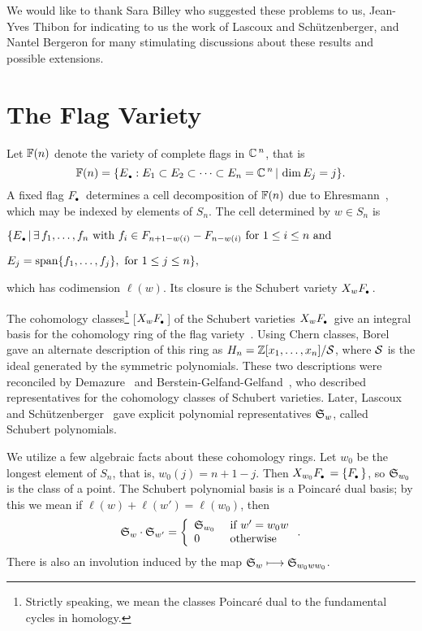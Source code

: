 We would like to thank Sara Billey who suggested these problems to us,
Jean-Yves Thibon for indicating to us the work of Lascoux and 
Sch\"utzenberger, and Nantel Bergeron for many stimulating discussions 
about these results and possible extensions.

\section{The Flag Variety}

Let ${\Bbb F}(n)$ denote the variety of complete flags in ${\Bbb C}\,^n$, 
that is
$$
{\Bbb F}(n) = 
\{ \Edot : E_1\subset E_2\subset \cdots\subset E_n = {\Bbb C}\,^n \,|\,
\dim{E_j} = j\}.
$$
A fixed flag $\Fdot$ determines a cell decomposition of ${\Bbb F}(n)$
due to Ehresmann~\cite{Ehresmann}, which may be
indexed by elements of $S_n$.
The cell determined by $w \in S_n$ is 
\medskip

\noindent $\{ \Edot \,|\, \exists\, f_1,\ldots,f_n \mbox{ with }
f_i \in F_{n+1-w(i)}-
F_{n-w(i)} \mbox{ for }  1\leq i\leq n \mbox{ and }$

\hfill
$E_j = \mbox{span}\{f_1,\ldots,f_j\},\mbox{ for }  1\leq j\leq n\},$\medskip

\noindent
which has codimension $\ell(w)$.
Its closure is the Schubert variety   $X_{w}\Fdot$.


The cohomology classes\footnote{Strictly speaking, we mean the 
classes Poincar\'e dual to the fundamental cycles in homology.}
[$X_w\Fdot$] of the Schubert varieties $X_w\Fdot$ give 
an integral basis for the cohomology ring of the flag 
variety~\cite{Ehresmann}.
Using Chern classes, Borel~\cite{Borel} gave an alternate description 
of this ring as $H_n = {\Bbb Z}[x_1,\ldots,x_n]/{\cal S}$, 
where ${\cal S}$ is the ideal generated by the symmetric polynomials.
These two descriptions were reconciled by Demazure~\cite{Demazure}
and Berstein-Gelfand-Gelfand~\cite{BGG}, who described 
representatives for the cohomology classes of Schubert varieties.
Later, Lascoux and 
Sch\"utzenberger~\cite{Lascoux_Schutzenberger_polynomes_schubert}
gave explicit polynomial representatives ${\frak S}_{w}$, called 
Schubert polynomials.

We utilize a few algebraic facts about these cohomology rings.
Let $w_0$ be the longest element of $S_n$, that is,
$w_0(j) = n{+}1{-}j$.
Then 
$X_{w_0}\Fdot = \{\Fdot\}$, so ${\frak S}_{w_0}$
is the class of a point.
The Schubert polynomial basis is a Poincar\'e dual basis;
by this we mean  if 
$\ell(w) + \ell(w') = \ell(w_0)$, then 
$$
{\frak S}_{w} \cdot {\frak S}_{w'}
= \left\{\begin{array}{ll} {\frak S}_{w_0}&\mbox{ if }
w' = w_0 w\\
0 & \mbox{ otherwise} \end{array}\right.. %
$$
There is also an involution induced by the map
${\frak S}_{w} \longmapsto
{\frak S}_{w_0ww_0}$.
\smallskip



